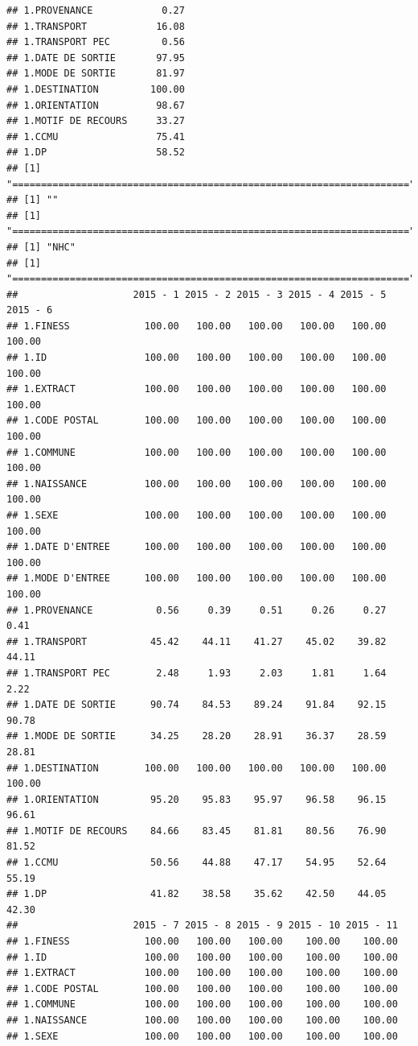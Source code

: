 \documentclass[]{article}
\begin{document}
\begin{verbatim}
## 1.PROVENANCE            0.27
## 1.TRANSPORT            16.08
## 1.TRANSPORT PEC         0.56
## 1.DATE DE SORTIE       97.95
## 1.MODE DE SORTIE       81.97
## 1.DESTINATION         100.00
## 1.ORIENTATION          98.67
## 1.MOTIF DE RECOURS     33.27
## 1.CCMU                 75.41
## 1.DP                   58.52
## [1] "====================================================================="
## [1] ""
## [1] "====================================================================="
## [1] "NHC"
## [1] "====================================================================="
##                    2015 - 1 2015 - 2 2015 - 3 2015 - 4 2015 - 5 2015 - 6
## 1.FINESS             100.00   100.00   100.00   100.00   100.00   100.00
## 1.ID                 100.00   100.00   100.00   100.00   100.00   100.00
## 1.EXTRACT            100.00   100.00   100.00   100.00   100.00   100.00
## 1.CODE POSTAL        100.00   100.00   100.00   100.00   100.00   100.00
## 1.COMMUNE            100.00   100.00   100.00   100.00   100.00   100.00
## 1.NAISSANCE          100.00   100.00   100.00   100.00   100.00   100.00
## 1.SEXE               100.00   100.00   100.00   100.00   100.00   100.00
## 1.DATE D'ENTREE      100.00   100.00   100.00   100.00   100.00   100.00
## 1.MODE D'ENTREE      100.00   100.00   100.00   100.00   100.00   100.00
## 1.PROVENANCE           0.56     0.39     0.51     0.26     0.27     0.41
## 1.TRANSPORT           45.42    44.11    41.27    45.02    39.82    44.11
## 1.TRANSPORT PEC        2.48     1.93     2.03     1.81     1.64     2.22
## 1.DATE DE SORTIE      90.74    84.53    89.24    91.84    92.15    90.78
## 1.MODE DE SORTIE      34.25    28.20    28.91    36.37    28.59    28.81
## 1.DESTINATION        100.00   100.00   100.00   100.00   100.00   100.00
## 1.ORIENTATION         95.20    95.83    95.97    96.58    96.15    96.61
## 1.MOTIF DE RECOURS    84.66    83.45    81.81    80.56    76.90    81.52
## 1.CCMU                50.56    44.88    47.17    54.95    52.64    55.19
## 1.DP                  41.82    38.58    35.62    42.50    44.05    42.30
##                    2015 - 7 2015 - 8 2015 - 9 2015 - 10 2015 - 11
## 1.FINESS             100.00   100.00   100.00    100.00    100.00
## 1.ID                 100.00   100.00   100.00    100.00    100.00
## 1.EXTRACT            100.00   100.00   100.00    100.00    100.00
## 1.CODE POSTAL        100.00   100.00   100.00    100.00    100.00
## 1.COMMUNE            100.00   100.00   100.00    100.00    100.00
## 1.NAISSANCE          100.00   100.00   100.00    100.00    100.00
## 1.SEXE               100.00   100.00   100.00    100.00    100.00

\end{verbatim}
\end{document}
